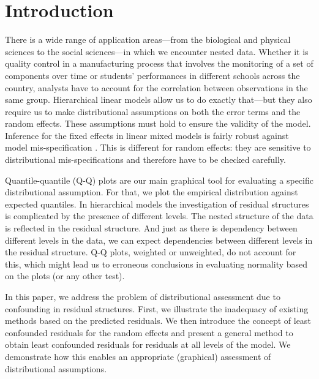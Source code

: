 \documentclass[11pt]{article} %
\begin{document}
\section{Introduction}\label{sec:intro}
There is a wide range of application areas---from the biological and physical sciences to the social sciences---in which we encounter nested  data.
Whether it is quality control in a manufacturing process that involves the monitoring of a set of components over  time  or students' performances in different schools across the country, analysts have to account for  the correlation between observations in the same group.  Hierarchical linear models allow us to do exactly that---but they also require us to 
 make distributional assumptions on both the error terms and the random effects.
 These assumptions must hold to ensure the validity of the model. Inference for the fixed effects in linear mixed models is fairly robust against model mis-specification \citep{Butler:1992tx, Verbeke:1997tf}. This is different for random effects: they are sensitive to  distributional mis-specifications and  therefore have to be checked carefully.

Quantile-quantile (Q-Q) plots \citep{Wilk:1968} are our main graphical tool for evaluating a specific distributional assumption. For that, we plot the empirical distribution against expected quantiles. In hierarchical models the investigation of residual structures is complicated by the presence of  different levels. 
The nested structure of the data is reflected in the residual structure. And just as there is dependency between different levels in the data, we can expect dependencies between different levels in the residual structure. Q-Q plots, weighted \citep{Dempster:1985tr, Lange:1989uu} or unweighted, do not account for this, which might lead us to erroneous conclusions in evaluating normality based on the plots (or any other test).



In this paper, we address the problem of distributional assessment due to confounding in residual structures. 
First, we illustrate the inadequacy of existing methods  based on the predicted residuals. 
We then introduce  the concept of least confounded residuals for the random effects and present a general method to obtain least confounded residuals for residuals at all levels of the model. We demonstrate how this enables an appropriate (graphical) assessment  of distributional assumptions.
% 
\end{document}
